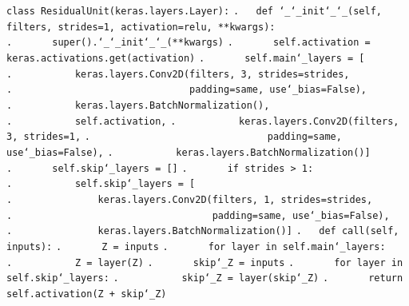 \texttt{class ResidualUnit(keras.layers.Layer):}\newline
\texttt{.~~~def \char`_\char`_init\char`_\char`_(self, filters, strides=1, activation=\textquotesingle relu\textquotesingle, **kwargs):}\newline
\texttt{.~~~~~~~super().\char`_\char`_init\char`_\char`_(**kwargs)}\newline
\texttt{.~~~~~~~self.activation = keras.activations.get(activation)}\newline
\texttt{.~~~~~~~self.main\char`_layers = [}\newline
\texttt{.~~~~~~~~~~~keras.layers.Conv2D(filters, 3, strides=strides,}\newline
\texttt{.~~~~~~~~~~~~~~~~~~~~~~~~~~~~~~~padding=\textquotesingle same\textquotesingle, use\char`_bias=False),}\newline
\texttt{.~~~~~~~~~~~keras.layers.BatchNormalization(),}\newline
\texttt{.~~~~~~~~~~~self.activation,}\newline
\texttt{.~~~~~~~~~~~keras.layers.Conv2D(filters, 3, strides=1,}\newline
\texttt{.~~~~~~~~~~~~~~~~~~~~~~~~~~~~~~~padding=\textquotesingle same\textquotesingle, use\char`_bias=False),}\newline
\texttt{.~~~~~~~~~~~keras.layers.BatchNormalization()]}\newline
\texttt{.~~~~~~~self.skip\char`_layers = []}\newline
\texttt{.~~~~~~~if strides > 1:}\newline
\texttt{.~~~~~~~~~~~self.skip\char`_layers = [}\newline
\texttt{.~~~~~~~~~~~~~~~keras.layers.Conv2D(filters, 1, strides=strides,}\newline
\texttt{.~~~~~~~~~~~~~~~~~~~~~~~~~~~~~~~~~~~padding=\textquotesingle same\textquotesingle, use\char`_bias=False),}\newline
\texttt{.~~~~~~~~~~~~~~~keras.layers.BatchNormalization()]}\newline
\texttt{}\newline
\texttt{.~~~def call(self, inputs):}\newline
\texttt{.~~~~~~~Z = inputs}\newline
\texttt{.~~~~~~~for layer in self.main\char`_layers:}\newline
\texttt{.~~~~~~~~~~~Z = layer(Z)}\newline
\texttt{.~~~~~~~skip\char`_Z = inputs}\newline
\texttt{.~~~~~~~for layer in self.skip\char`_layers:}\newline
\texttt{.~~~~~~~~~~~skip\char`_Z = layer(skip\char`_Z)}\newline
\texttt{.~~~~~~~return self.activation(Z + skip\char`_Z)}\newline

